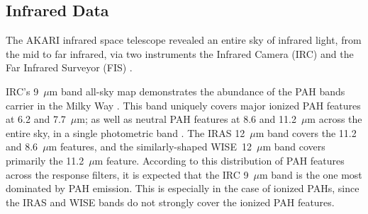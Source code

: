 \documentclass[preprint2,longabstract]{aastex}
\begin{document}
\subsection{Infrared Data}

     The AKARI infrared space telescope revealed an entire sky of infrared light, from the mid to far infrared, via two instruments \citep{akari07} the Infrared Camera (IRC)\citep{irc07} and the Far Infrared Surveyor (FIS) \citep{fis07}. 
     
     IRC's 9~$\mu$m band all-sky map demonstrates the abundance of the PAH bands carrier in the Milky Way \citep{ishihara10}. This band uniquely covers major ionized PAH features at 6.2 and 7.7~$\mu$m; as well as neutral PAH features at 8.6 and 11.2~$\mu$m across the entire sky, in a single photometric band \citep{onaka99,irc07}. The IRAS 12~$\mu$m band covers the 11.2 and 8.6~$\mu$m features, and the similarly-shaped WISE~12~$\mu$m band covers primarily the 11.2~$\mu$m feature. According to this distribution of PAH features across the response filters, it is expected that the IRC 9~$\mu$m band is the one most dominated by PAH emission. This is especially in the case of ionized PAHs, since the IRAS and WISE bands do not strongly cover the ionized PAH features.
\end{document}
